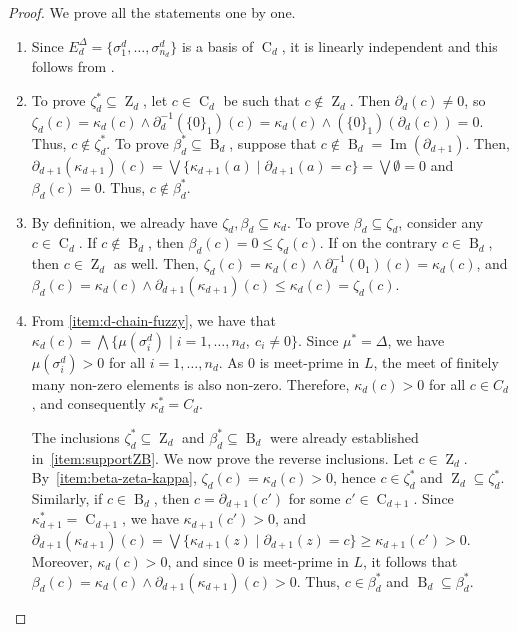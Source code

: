 \documentclass[a4paper,10pt]{article}
\newcommand{\im}{\operatorname{Im}}
\newcommand{\E}{E^\Delta}
\DeclareMathOperator{\Co}{C}
\DeclareMathOperator{\Zo}{Z}
\DeclareMathOperator{\Bo}{B}
\begin{document}
\begin{proof}
We prove all the statements one by one.
\begin{enumerate}[label=(\roman*)]
\item Since \(\E_d=\{\sigma^{d}_{1}, \dots, \sigma^{d}_{n_d}\}\) is a basis of \(\Co_d\), it is linearly independent and this follows from .
\item To prove \(\zeta_d^* \subseteq \Zo_d\), let \(c\in \Co_d\) be such that \(c \notin \Zo_d\). Then \(\partial_d(c) \neq 0\), so \(\zeta_d(c) = \kappa_d(c) \wedge \partial_d^{-1}(\{0\}_1)(c) = \kappa_d(c) \wedge (\{0\}_1)(\partial_d(c)) = 0.\) Thus, $c \notin \zeta_d^*$. To prove \(\beta_d^* \subseteq \Bo_d\), suppose that \(c \notin \Bo_d = \im(\partial_{d+1})\). Then, 
\(\partial_{d+1}(\kappa_{d+1})(c) = \bigvee \{\kappa_{d+1}(a) \mid \partial_{d+1}(a)=c\} = \bigvee \emptyset = 0\) and $\beta_d(c)=0$. Thus, $c \notin \beta_d^*$.
\item By definition, we already have $\zeta_d, \beta_d \subseteq \kappa_d$. To prove $\beta_d \subseteq \zeta_d$, consider any $c \in \Co_d$. If $c \notin \Bo_d$, then $\beta_d(c) = 0 \leq \zeta_d(c)$. If  on the contrary $c \in \Bo_d$, then $c \in \Zo_d$ as well. Then, \(\zeta_d(c) = \kappa_d(c) \wedge \partial_d^{-1}(0_1)(c) = \kappa_d(c)\), and
\(\beta_d(c) = \kappa_d(c) \wedge \partial_{d+1}(\kappa_{d+1})(c) \leq \kappa_d(c) = \zeta_d(c)\).
\item From \ref{item:d-chain-fuzzy}, we have that \(\kappa_d(c) = \bigwedge \{\mu(\sigma^{d}_{i}) \mid i = 1, \dots, n_d,\ c_i \neq 0\}\). Since \(\mu^* = \Delta\), we have \(\mu(\sigma^{d}_{i}) > 0\) for all \(i = 1, \dots, n_d\). As \(0\) is meet-prime in \(L\), the meet of finitely many non-zero elements is also non-zero. Therefore, \(\kappa_d(c) > 0\) for all \(c \in C_d\), and consequently \(\kappa_d^* = C_d\).

The inclusions \(\zeta_d^* \subseteq \Zo_d\) and \(\beta_d^* \subseteq \Bo_d\) were already established in~\ref{item:supportZB}. We now prove the reverse inclusions. Let \(c \in \Zo_d\). By~\ref{item:beta-zeta-kappa}, \(\zeta_d(c) = \kappa_d(c) > 0\), hence \(c \in \zeta_d^*\) and \(\Zo_d \subseteq \zeta_d^*\). Similarly, if \(c \in \Bo_d\), then \(c = \partial_{d+1}(c')\) for some \(c' \in \Co_{d+1}\). Since \(\kappa_{d+1}^* = \Co_{d+1}\), we have \(\kappa_{d+1}(c') > 0\), and \(\partial_{d+1}(\kappa_{d+1})(c) = \bigvee \{\kappa_{d+1}(z) \mid \partial_{d+1}(z)=c\} \geq \kappa_{d+1}(c') > 0\). Moreover, \(\kappa_d(c) > 0\), and since \(0\) is meet-prime in \(L\), it follows that \(\beta_d(c) = \kappa_d(c) \wedge \partial_{d+1}(\kappa_{d+1})(c) > 0\). Thus, \(c \in \beta_d^*\) and \(\Bo_d \subseteq \beta_d^*\). \qedhere
\end{enumerate}
\end{proof}
\end{document}
